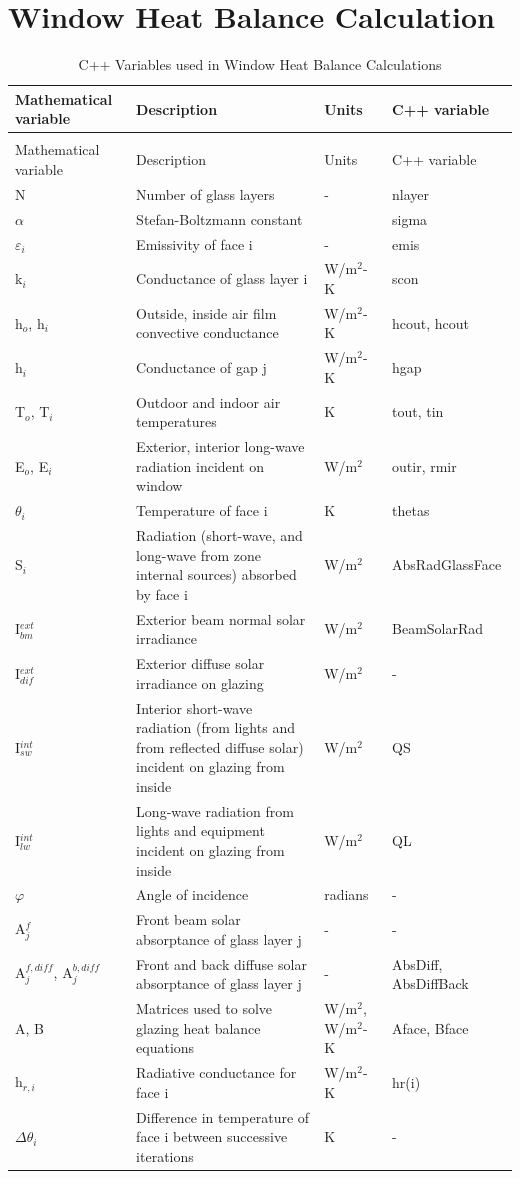 \section{Window Heat Balance Calculation}\label{window-heat-balance-calculation}

\begin{longtable}[c]{p{1.0in}p{2.5in}p{1.0in}p{1.5in}}
\caption{C++ Variables used in Window Heat Balance Calculations \label{table:c++-variables-used-in-window-heat-balance}} \tabularnewline
\toprule
Mathematical variable & Description & Units & C++ variable \tabularnewline
\midrule
\endfirsthead

\caption[]{C++ Variables used in Window Heat Balance Calculations} \tabularnewline
\toprule
Mathematical variable & Description & Units & C++ variable \tabularnewline
\midrule
\endhead

N & Number of glass layers & - & nlayer \tabularnewline
$\alpha$ & Stefan-Boltzmann constant & ~ & sigma \tabularnewline
$\varepsilon$\(_{i}\) & Emissivity of face i & - & emis \tabularnewline
k\(_{i}\) & Conductance of glass layer i & W/m\(^{2}\)-K & scon \tabularnewline
h\(_{o}\), h\(_{i}\) & Outside, inside air film convective conductance & W/m\(^{2}\)-K & hcout, hcout \tabularnewline
h\(_{i}\) & Conductance of gap j & W/m\(^{2}\)-K & hgap \tabularnewline
T\(_{o}\), T\(_{i}\) & Outdoor and indoor air temperatures & K & tout, tin \tabularnewline
E\(_{o}\), E\(_{i}\) & Exterior, interior long-wave radiation incident on window & W/m\(^{2}\) & outir, rmir \tabularnewline
$\theta$\(_{i}\) & Temperature of face i & K & thetas \tabularnewline
S\(_{i}\) & Radiation (short-wave, and long-wave from zone internal sources) absorbed by face i & W/m\(^{2}\) & AbsRadGlassFace \tabularnewline
I\(^{ext}_{bm}\) & Exterior beam normal solar irradiance & W/m\(^{2}\) & BeamSolarRad \tabularnewline
I\(^{ext}_{dif}\) & Exterior diffuse solar irradiance on glazing & W/m\(^{2}\) & - \tabularnewline
I\(^{int}_{sw}\) & Interior short-wave radiation (from lights and from reflected diffuse solar) incident on glazing from inside & W/m\(^{2}\) & QS \tabularnewline
I\(^{int}_{lw}\) & Long-wave radiation from lights and equipment incident on glazing from inside & W/m\(^{2}\) & QL \tabularnewline
$\varphi$ & Angle of incidence & radians & - \tabularnewline
A\(^{f}_{j}\) & Front beam solar absorptance of glass layer j & - & - \tabularnewline
A\(^{f,diff}_{j}\), A\(^{b,diff}_{j}\) & Front and back diffuse solar absorptance of glass layer j & - & AbsDiff, AbsDiffBack \tabularnewline
A, B & Matrices used to solve glazing heat balance equations & W/m\(^{2}\), W/m\(^{2}\)-K & Aface, Bface \tabularnewline
h\(_{r,i}\) & Radiative conductance for face i & W/m\(^{2}\)-K & hr(i) \tabularnewline
$\Delta\theta$\(_{i}\) & Difference in temperature of face i between successive iterations & K & - \tabularnewline
\bottomrule
\end{longtable}

